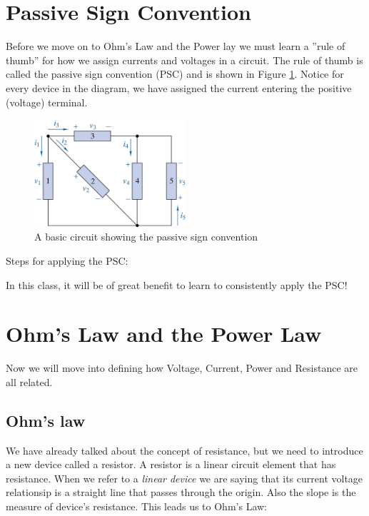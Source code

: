 \documentclass{handout}
\begin{document}
\newpage
\pagebreak
\clearpage

\section{Passive Sign Convention}
Before we move on to Ohm's Law and the Power lay we must learn a ''rule of thumb'' for how we assign currents and voltages in a circuit.  The rule of thumb is called the passive sign convention (PSC) and is shown in Figure \ref{fig: PSC}.  Notice for every device in the diagram, we have assigned the current entering the positive (voltage) terminal.

\begin{figure}[h t b]
\centering
\includegraphics[width=0.5\textwidth]{Passive_Sign_Convention.jpg}
\caption{A basic circuit showing the passive sign convention}
\label{fig: PSC}
\end{figure}

Steps for applying the PSC:

In this class, it will be of great benefit to learn to consistently apply the PSC!

\section{Ohm's Law and the Power Law}

Now we will move into defining how Voltage, Current, Power and Resistance are all related.

\subsection{Ohm's law}
We have already talked about the concept of resistance, but we need to introduce a new device called a resistor.  A resistor is a linear circuit element that has resistance.  When we refer to a {\em linear device} we are saying that its current voltage relationsip is a straight line that passes through the origin.  Also the slope is the measure of device's resistance.  This leads us to Ohm's Law:
\end{document}
